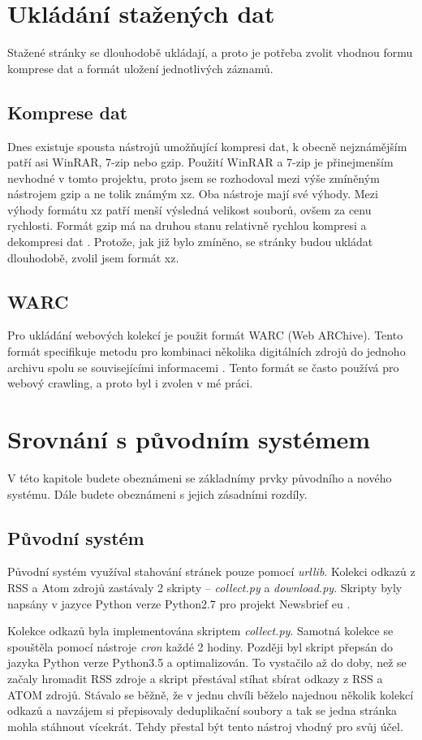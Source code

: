 \section{Ukládání stažených dat}
Stažené stránky se dlouhodobě ukládají, a proto je potřeba zvolit vhodnou formu komprese dat a formát uložení jednotlivých záznamů.

\subsection{Komprese dat}
Dnes existuje spousta nástrojů umožňující
kompresi dat, k obecně nejznámějším patří asi WinRAR, 7-zip nebo gzip. Použití WinRAR a 7-zip je přinejmenším nevhodné v tomto projektu,
proto jsem se rozhodoval mezi výše zmíněným nástrojem gzip a ne tolik známým xz. Oba nástroje mají své výhody.
Mezi výhody formátu xz patří menší výsledná velikost souborů, ovšem za cenu rychlosti. Formát gzip má na druhou stanu
relativně rychlou kompresi a dekompresi dat \cite{GZIP_VS_XZ}. Protože, jak již bylo zmíněno,
se stránky budou ukládat dlouhodobě, zvolil jsem formát xz.

\subsection{WARC}
\label{warc_format}
Pro ukládání webových kolekcí je použit formát WARC (Web ARChive). Tento formát specifikuje metodu pro kombinaci
několika digitálních zdrojů do jednoho archivu spolu se souvisejícími informacemi \cite{WARC_FROMAT}. Tento formát se často používá
pro webový crawling, a proto byl i zvolen v mé práci.

\section{Srovnání s původním systémem}
V této kapitole budete obeznámeni se základnímy prvky původního a nového systému. Dále budete
obeznámeni s jejich zásadními rozdíly.

\subsection{Původní systém}
Původní systém využíval stahování stránek pouze pomocí \textit{urllib}. Kolekci odkazů z RSS a Atom zdrojů zastávaly 2
skripty -- \textit{collect.py} a \textit{download.py}. Skripty byly napsány v jazyce Python verze Python2.7 pro projekt
Newsbrief eu \cite{NEWSBRIEF}.

Kolekce odkazů byla implementována skriptem \textit{collect.py}. Samotná kolekce se spouštěla pomocí nástroje \textit{cron} každé
2 hodiny. Později byl skript přepsán do jazyka Python verze Python3.5 a optimalizován. To vystačilo až do doby, než se začaly hromadit
RSS zdroje a skript přestával stíhat sbírat odkazy z RSS a ATOM zdrojů. Stávalo se běžně, že v jednu chvíli běželo najednou několik kolekcí odkazů
a navzájem si přepisovaly deduplikační soubory a tak se jedna stránka mohla stáhnout vícekrát. Tehdy přestal být tento nástroj vhodný
pro svůj účel.

